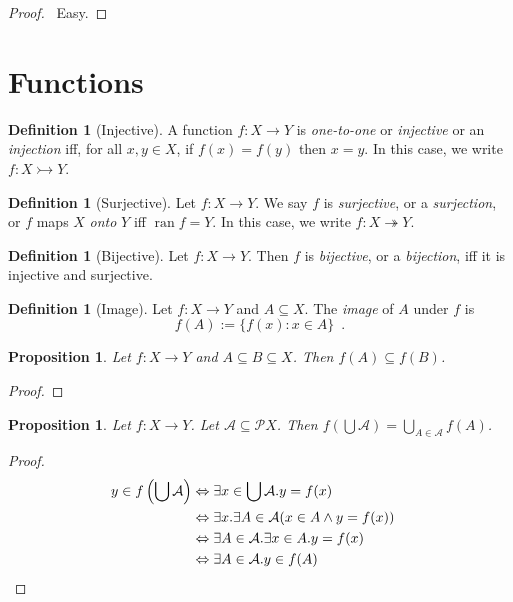 \documentclass{report}
\let\qed\relax
\newtheorem{prop}[ax]{Proposition}
\theoremstyle{definition}
\newtheorem{df}[ax]{Definition}
\newcommand{\ran}{\ensuremath{\operatorname{ran}}}
\begin{document}
\begin{proof}
\pf\ Easy. \qed
\end{proof}

\section{Functions}

\begin{df}[Injective]
A function $f : X \rightarrow Y$ is \emph{one-to-one} or 	\emph{injective} or an \emph{injection} iff, for all $x,y \in X$, if $f(x) = f(y)$ then $x = y$. In this case, we write $f : X \rightarrowtail Y$.
\end{df}

\begin{df}[Surjective]
Let $f : X \rightarrow Y$. We say $f$ is \emph{surjective}, or a \emph{surjection}, or $f$ maps $X$ \emph{onto} $Y$ iff $\ran f = Y$. In this case, we write $f : X \twoheadrightarrow Y$.
\end{df}

\begin{df}[Bijective]
Let $f : X \rightarrow Y$. Then $f$ is \emph{bijective}, or a \emph{bijection}, iff it is injective and surjective.
\end{df}

\begin{df}[Image]
Let $f : X \rightarrow Y$ and $A \subseteq X$. The \emph{image} of $A$ under $f$ is
\[ f(A) := \{ f(x) : x \in A \} \enspace . \]
\end{df}

\begin{prop}
Let $f : X \rightarrow Y$ and $A \subseteq B \subseteq X$. Then $f(A) \subseteq f(B)$.
\end{prop}

\begin{proof}
\pf
{}
\qed
\end{proof}

\begin{prop}
Let $f : X \rightarrow Y$. Let $\mathcal{A} \subseteq \mathcal{P} X$. Then $f \left( \bigcup \mathcal{A} \right) = \bigcup_{A \in \mathcal{A}} f(A)$.
\end{prop}

\begin{proof}
\pf
\begin{align*}
y \in f \left( \bigcup \mathcal{A} \right)
& \Leftrightarrow \exists x \in \bigcup \mathcal{A}. y = f(x) \\
& \Leftrightarrow \exists x. \exists A \in \mathcal{A} (x \in A \wedge y = f(x)) \\
& \Leftrightarrow \exists A \in \mathcal{A}. \exists x \in A. y = f(x) \\
& \Leftrightarrow \exists A \in \mathcal{A}. y \in f(A) & \qed
\end{align*}
\end{proof}
\end{document}
